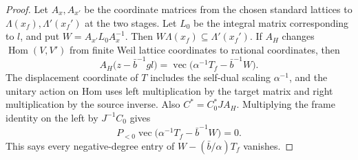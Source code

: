 \begin{proof}
Let $A_x,A_{x'}$ be the coordinate matrices from the chosen standard lattices to $\Lambda(x_f),\Lambda'(x_f')$ at the two stages. Let $L_0$ be the integral matrix corresponding to $l$, and put $W=A_{x'}L_0A_x^{-1}$. Then $W\Lambda(x_f)\subseteq\Lambda'(x_f')$. If $A_H$ changes $\operatorname{Hom}(V,V')$ from finite Weil lattice coordinates to rational coordinates, then
\[
 A_H\bigl(z-\bar b^{-1}g l\bigr)
     =\operatorname{vec}\bigl(\alpha^{-1}T_f-\bar b^{-1}W\bigr).
\]
The displacement coordinate of $T$ includes the self-dual scaling $\alpha^{-1}$, and the unitary action on Hom uses left multiplication by the target matrix and right multiplication by the source inverse. Also $C^\ast=C_0^\ast J A_H$. Multiplying the frame identity on the left by $J^{-1}C_0$ gives
\[
 P_{<0}\operatorname{vec}
     \bigl(\alpha^{-1}T_f-\bar b^{-1}W\bigr)=0.
\]
This says every negative-degree entry of $W-(\bar b/\alpha)T_f$ vanishes.
\end{proof}

